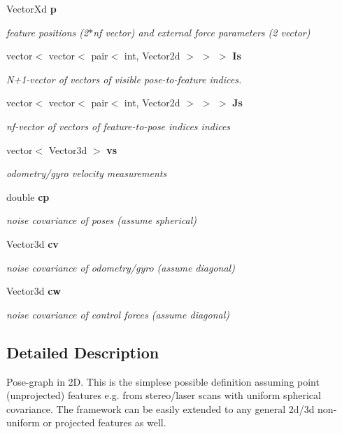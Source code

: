 \begin{DoxyCompactItemize}
\-Vector\-Xd {\bf p}
\begin{DoxyCompactList}\small\item\em feature positions (2$\ast$nf vector) and external force parameters (2 vector) \end{DoxyCompactList}\item 
vector$<$ vector$<$ pair$<$ int, \*
\-Vector2d $>$ $>$ $>$ {\bf \-Is}
\begin{DoxyCompactList}\small\item\em \-N+1-\/vector of vectors of visible pose-\/to-\/feature indices. \end{DoxyCompactList}\item 
vector$<$ vector$<$ pair$<$ int, \*
\-Vector2d $>$ $>$ $>$ {\bf \-Js}
\begin{DoxyCompactList}\small\item\em nf-\/vector of vectors of feature-\/to-\/pose indices indices \end{DoxyCompactList}\item 
vector$<$ \-Vector3d $>$ {\bf vs}
\begin{DoxyCompactList}\small\item\em odometry/gyro velocity measurements \end{DoxyCompactList}\item 
double {\bf cp}
\begin{DoxyCompactList}\small\item\em noise covariance of poses (assume spherical) \end{DoxyCompactList}\item 
\-Vector3d {\bf cv}
\begin{DoxyCompactList}\small\item\em noise covariance of odometry/gyro (assume diagonal) \end{DoxyCompactList}\item 
\-Vector3d {\bf cw}
\begin{DoxyCompactList}\small\item\em noise covariance of control forces (assume diagonal) \end{DoxyCompactList}\end{DoxyCompactItemize}


\subsection{\-Detailed \-Description}
\-Pose-\/graph in 2\-D. \-This is the simplese possible definition assuming point (unprojected) features e.\-g. from stereo/laser scans with uniform spherical covariance. \-The framework can be easily extended to any general 2d/3d non-\/uniform or projected features as well. 

